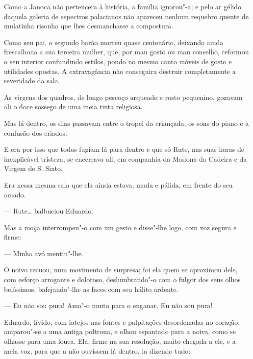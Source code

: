 Como a Janoca não pertencera à história, a família ignorou"-a; e pelo ar
gélido daquela galeria de espectros palacianos não apareceu nenhum
requebro quente de mulatinha risonha que lhes desmanchasse a compostura.

Como seu pai, o segundo barão morreu quase centenário, deixando ainda
frescalhona a sua terceira mulher, que, por mau gosto ou mau conselho,
reformou o seu interior confundindo estilos, pondo no mesmo canto móveis
de gosto e utilidades opostas. A extravagância não conseguira destruir
completamente a severidade da sala.

As virgens dos quadros, de longo pescoço arqueado e rosto pequenino,
gozavam ali o doce sossego de uma meia tinta religiosa.

Mas lá dentro, os dias passavam entre o tropel da criançada, os sons do
piano e a confusão dos criados.

E era por isso que todos fugiam lá para dentro e que só Rute, nas suas
horas de inexplicável tristeza, se encerrava ali, em companhia da Madona
da Cadeira e da Virgem de S. Sixto.

Era nessa mesma sala que ela ainda estava, muda e pálida, em frente do
seu amado.

--- Rute\ldots{} balbuciou Eduardo.

Mas a moça interrompeu"-o com um gesto e disse"-lhe logo, com voz segura e
firme:

--- Minha avó mentiu"-lhe.

O noivo recuou, num movimento de surpresa; foi ela quem se aproximou
dele, com esforço arrogante e doloroso, deslumbrando"-o com o fulgor dos
seus olhos belíssimos, bafejando"-lhe as faces com seu hálito ardente.

--- Eu não sou pura! Amo"-o muito para o enganar. Eu não sou pura!

Eduardo, lívido, com latejos nas fontes e palpitações desordenadas no
coração, amparou"-se a uma antiga poltrona, e olhou espantado para a
noiva, como se olhasse para uma louca. Ela, firme na sua resolução,
muito chegada a ele, e a meia voz, para que a não ouvissem lá dentro, ia
dizendo tudo:

